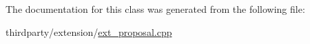 The documentation for this class was generated from the following file\+:\begin{DoxyCompactItemize}
\item 
thirdparty/extension/\hyperlink{ext__proposal_8cpp}{ext\+\_\+proposal.\+cpp}\end{DoxyCompactItemize}
